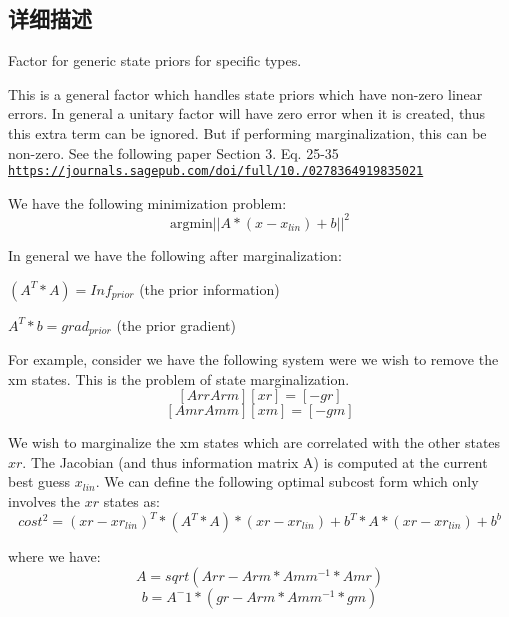\subsection{详细描述}
Factor for generic state priors for specific types. 

This is a general factor which handles state priors which have non-\/zero linear errors. In general a unitary factor will have zero error when it is created, thus this extra term can be ignored. But if performing marginalization, this can be non-\/zero. See the following paper Section 3. Eq. 25-\/35 \href{https://journals.sagepub.com/doi/full/10.1177/0278364919835021}{\tt https\+://journals.\+sagepub.\+com/doi/full/10./0278364919835021}

We have the following minimization problem\+: \[ \textrm{argmin} ||A * (x - x_{lin}) + b||^2 \]

In general we have the following after marginalization\+:
\begin{DoxyItemize}
\item $(A^T*A) = Inf_{prior} $ (the prior information)
\item $A^T*b = grad_{prior} $ (the prior gradient)
\end{DoxyItemize}

For example, consider we have the following system were we wish to remove the xm states. This is the problem of state marginalization. \[ [ Arr Arm ] [ xr ] = [ - gr ] \] \[ [ Amr Amm ] [ xm ] = [ - gm ] \]

We wish to marginalize the xm states which are correlated with the other states $ xr $. The Jacobian (and thus information matrix A) is computed at the current best guess $ x_{lin} $. We can define the following optimal subcost form which only involves the $ xr $ states as\+: \[ cost^2 = (xr - xr_{lin})^T*(A^T*A)*(xr - xr_{lin}) + b^T*A*(xr - xr_{lin}) + b^b \]

where we have\+: \[ A = sqrt(Arr - Arm*Amm^{-1}*Amr) \] \[ b = A^-1 * (gr - Arm*Amm^{-1}*gm) \] 